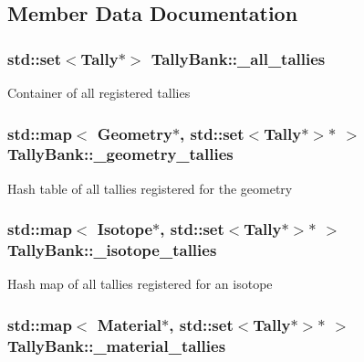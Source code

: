 \subsection{Member Data Documentation}
\hypertarget{classTallyBank_a70424c03332fd144a06d4a0b25426fb3}{
\subsubsection[{\-\_\-all\-\_\-tallies}]{\setlength{\rightskip}{0pt plus 5cm}std\-::set$<${\bf Tally}$\ast$$>$ Tally\-Bank\-::\-\_\-all\-\_\-tallies\hspace{0.3cm}{\ttfamily [private]}}}\label{classTallyBank_a70424c03332fd144a06d4a0b25426fb3}
Container of all registered tallies \hypertarget{classTallyBank_a29eb48c6c05829ac572782ab65d224d4}{
\subsubsection[{\-\_\-geometry\-\_\-tallies}]{\setlength{\rightskip}{0pt plus 5cm}std\-::map$<$ {\bf Geometry}$\ast$, std\-::set$<${\bf Tally}$\ast$$>$$\ast$ $>$ Tally\-Bank\-::\-\_\-geometry\-\_\-tallies\hspace{0.3cm}{\ttfamily [private]}}}\label{classTallyBank_a29eb48c6c05829ac572782ab65d224d4}
Hash table of all tallies registered for the geometry \hypertarget{classTallyBank_a9d5bb358e7a434a6b6b6a9239a0af353}{
\subsubsection[{\-\_\-isotope\-\_\-tallies}]{\setlength{\rightskip}{0pt plus 5cm}std\-::map$<$ {\bf Isotope}$\ast$, std\-::set$<${\bf Tally}$\ast$$>$$\ast$ $>$ Tally\-Bank\-::\-\_\-isotope\-\_\-tallies\hspace{0.3cm}{\ttfamily [private]}}}\label{classTallyBank_a9d5bb358e7a434a6b6b6a9239a0af353}
Hash map of all tallies registered for an isotope \hypertarget{classTallyBank_abb5dff298a205ff6bb3aeae5851e78ae}{
\subsubsection[{\-\_\-material\-\_\-tallies}]{\setlength{\rightskip}{0pt plus 5cm}std\-::map$<$ {\bf Material}$\ast$, std\-::set$<${\bf Tally}$\ast$$>$$\ast$ $>$ Tally\-Bank\-::\-\_\-material\-\_\-tallies\hspace{0.3cm}{\ttfamily [private]}}}\label{classTallyBank_abb5dff298a205ff6bb3aeae5851e78ae}
